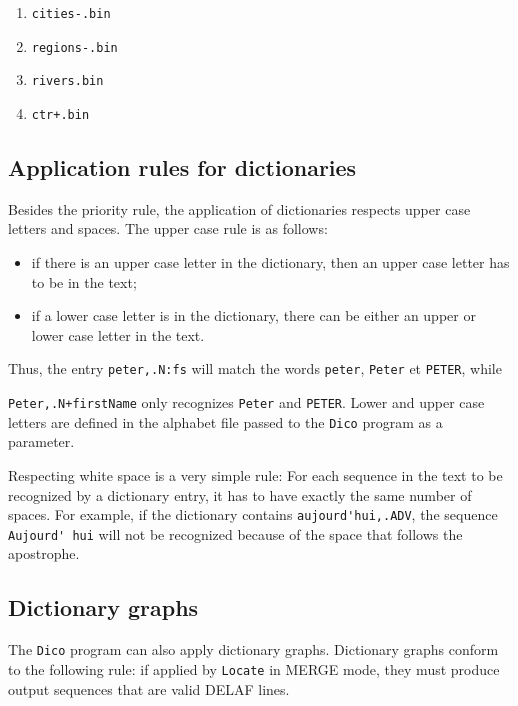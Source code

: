 \bigskip
\begin{enumerate}
  \item \verb$cities-.bin$
  \item \verb$regions-.bin$
  \item \verb$rivers.bin$
  \item \verb$ctr+.bin$
\end{enumerate}

\subsection{Application rules for dictionaries}
\label{section-transducer-application-rules}

Besides the priority rule, the application of dictionaries respects  upper  case
letters and spaces. The upper case rule is as follows:

\begin{itemize}
  \item if there is an upper case letter in the dictionary, then an upper case
  letter has to be in the text;
  
  \item if a lower case letter is in the dictionary, there can be either an upper
  or lower case letter in the text.
\end{itemize}

\bigskip
\noindent Thus, the entry \verb$peter,.N:fs$ will match the words \verb+peter+,
\verb+Peter+ et \verb+PETER+, while

\noindent \verb$Peter,.N+firstName$ only 
recognizes \verb+Peter+ and \verb+PETER+. Lower and upper case
letters are defined in the alphabet file passed to the \verb+Dico+ program
 as a parameter.

\bigskip
\noindent Respecting white space is a very simple rule: For each sequence in the text to be
recognized by a dictionary entry, it has to have exactly the same number of
spaces. For example, if the dictionary contains \verb+aujourd'hui,.ADV+, the
sequence \verb+Aujourd' hui+ will not be recognized because of the space that
follows the apostrophe.


\subsection{Dictionary graphs}
\label{section-dictionary-graphs}
The \verb+Dico+ program
can also apply dictionary graphs. Dictionary graphs conform to the following
rule: if applied by \verb+Locate+ in MERGE mode,
they must produce output sequences that are valid DELAF lines.

